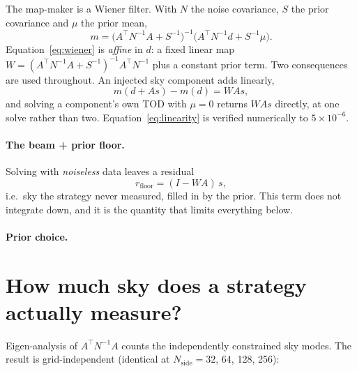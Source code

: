 \documentclass[a4paper,fleqn,usenatbib]{mnras}
\begin{document}
The map-maker is a Wiener filter. With $N$ the noise covariance, $S$ the prior
covariance and $\mu$ the prior mean,
\begin{equation}
  m = \bigl(A^{\top} N^{-1} A + S^{-1}\bigr)^{-1}
      \bigl(A^{\top} N^{-1} d + S^{-1}\mu\bigr).
  \label{eq:wiener}
\end{equation}
Equation~\eqref{eq:wiener} is \emph{affine} in $d$: a fixed linear map
$W = (A^{\top}N^{-1}A + S^{-1})^{-1}A^{\top}N^{-1}$ plus a constant prior term.
Two consequences are used throughout. An injected sky component adds linearly,
\begin{equation}
  m(d + A s) - m(d) = W A s,
  \label{eq:linearity}
\end{equation}
and solving a component's own TOD with $\mu = 0$ returns $WAs$ directly, at one
solve rather than two. Equation~\eqref{eq:linearity} is verified numerically to
$5\times10^{-6}$.

\paragraph{The beam + prior floor.}
Solving with \emph{noiseless} data leaves a residual
\begin{equation}
  r_{\mathrm{floor}} = (I - WA)\,s,
  \label{eq:floor}
\end{equation}
i.e.\ sky the strategy never measured, filled in by the prior. This term does
not integrate down, and it is the quantity that limits everything below.

\paragraph{Prior choice.}

\section{How much sky does a strategy actually measure?}
\label{sec:modes}

Eigen-analysis of $A^{\top}N^{-1}A$ counts the independently constrained sky
modes. The result is grid-independent (identical at $N_{\mathrm{side}} = 32$,
64, 128, 256):
\end{document}
